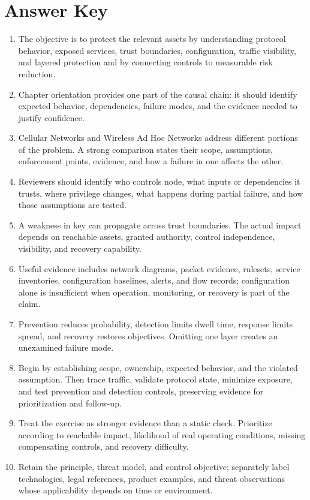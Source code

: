 \documentclass[11pt,letterpaper]{article}
\begin{document}
\section*{Answer Key}
\begin{enumerate}
\item The objective is to protect the relevant assets by understanding protocol behavior, exposed services, trust boundaries, configuration, traffic visibility, and layered protection and by connecting controls to measurable risk reduction.
\item Chapter orientation provides one part of the causal chain: it should identify expected behavior, dependencies, failure modes, and the evidence needed to justify confidence.
\item Cellular Networks and Wireless Ad Hoc Networks address different portions of the problem. A strong comparison states their scope, assumptions, enforcement points, evidence, and how a failure in one affects the other.
\item Reviewers should identify who controls node, what inputs or dependencies it trusts, where privilege changes, what happens during partial failure, and how those assumptions are tested.
\item A weakness in key can propagate across trust boundaries. The actual impact depends on reachable assets, granted authority, control independence, visibility, and recovery capability.
\item Useful evidence includes network diagrams, packet evidence, rulesets, service inventories, configuration baselines, alerts, and flow records; configuration alone is insufficient when operation, monitoring, or recovery is part of the claim.
\item Prevention reduces probability, detection limits dwell time, response limits spread, and recovery restores objectives. Omitting one layer creates an unexamined failure mode.
\item Begin by establishing scope, ownership, expected behavior, and the violated assumption. Then trace traffic, validate protocol state, minimize exposure, and test prevention and detection controls, preserving evidence for prioritization and follow-up.
\item Treat the exercise as stronger evidence than a static check. Prioritize according to reachable impact, likelihood of real operating conditions, missing compensating controls, and recovery difficulty.
\item Retain the principle, threat model, and control objective; separately label technologies, legal references, product examples, and threat observations whose applicability depends on time or environment.
\end{enumerate}
\end{document}
